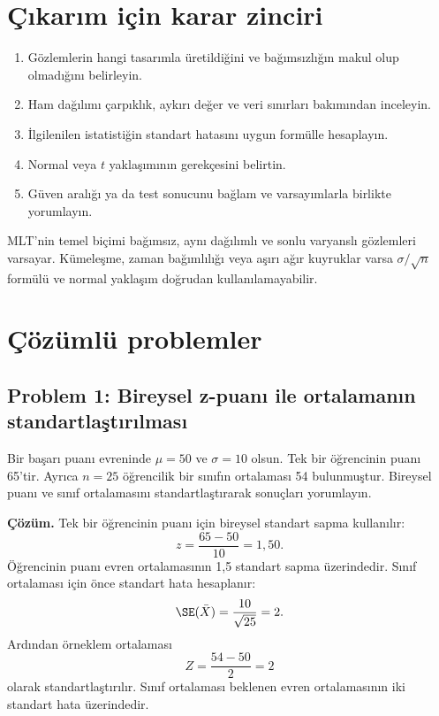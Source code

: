 \section{Çıkarım için karar zinciri}

\begin{enumerate}
  \item Gözlemlerin hangi tasarımla üretildiğini ve bağımsızlığın makul olup olmadığını belirleyin.
  \item Ham dağılımı çarpıklık, aykırı değer ve veri sınırları bakımından inceleyin.
  \item İlgilenilen istatistiğin standart hatasını uygun formülle hesaplayın.
  \item Normal veya $t$ yaklaşımının gerekçesini belirtin.
  \item Güven aralığı ya da test sonucunu bağlam ve varsayımlarla birlikte yorumlayın.
\end{enumerate}

\begin{assumptionbox}
MLT'nin temel biçimi bağımsız, aynı dağılımlı ve sonlu varyanslı gözlemleri
varsayar. Kümeleşme, zaman bağımlılığı veya aşırı ağır kuyruklar varsa
$\sigma/\sqrt n$ formülü ve normal yaklaşım doğrudan kullanılamayabilir.
\end{assumptionbox}

\section{Çözümlü problemler}

\subsection*{Problem 1: Bireysel z-puanı ile ortalamanın standartlaştırılması}

Bir başarı puanı evreninde $\mu=50$ ve $\sigma=10$ olsun. Tek bir öğrencinin
puanı 65'tir. Ayrıca $n=25$ öğrencilik bir sınıfın ortalaması 54 bulunmuştur.
Bireysel puanı ve sınıf ortalamasını standartlaştırarak sonuçları yorumlayın.

\textbf{Çözüm.} Tek bir öğrencinin puanı için bireysel standart sapma
kullanılır:
\[
z=\frac{65-50}{10}=1{,}50.
\]
Öğrencinin puanı evren ortalamasının 1,5 standart sapma üzerindedir. Sınıf
ortalaması için önce standart hata hesaplanır:
\[
\SE(\bar X)=\frac{10}{\sqrt{25}}=2.
\]
Ardından örneklem ortalaması
\[
Z=\frac{54-50}{2}=2
\]
olarak standartlaştırılır. Sınıf ortalaması beklenen evren ortalamasının iki
standart hata üzerindedir.

